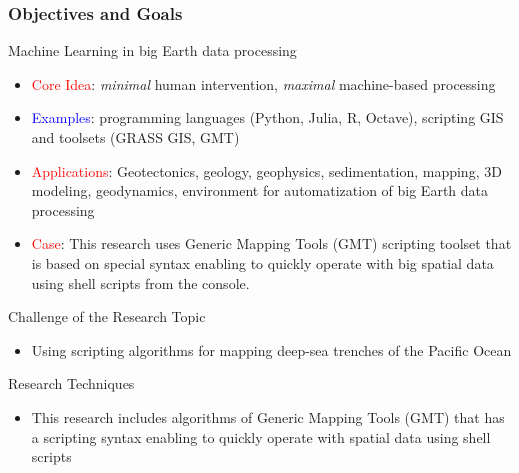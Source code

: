 \documentclass[pdflatex,compress,8pt,
	xcolor={dvipsnames,svgnames,x11names,table},
	hyperref={colorlinks = true,breaklinks = true, urlcolor = NavyBlue}]{beamer}
\begin{document}
\begin{frame}\frametitle{Objectives and Goals}
 
\begin{alertblock}{Machine Learning in big Earth data processing}
\begin{itemize}
	\item \textcolor{red}{Core Idea}: \emph{minimal} human intervention, \emph{maximal} machine-based processing
	\item \textcolor{blue}{Examples}: programming languages (Python, Julia, R, Octave), scripting GIS and toolsets (GRASS GIS, GMT)
	\item \textcolor{red}{Applications}: Geotectonics, geology, geophysics, sedimentation, mapping, 3D modeling, geodynamics, environment for automatization of big Earth data processing
	\item \textcolor{red}{Case}: This research uses Generic Mapping Tools (GMT) scripting toolset that is based on special syntax enabling to quickly operate with big spatial data using shell scripts from the console.
\end{itemize}
\end{alertblock}

\begin{exampleblock}{Challenge of the Research Topic}
\begin{itemize}
        	\item Using scripting algorithms for mapping deep-sea trenches of the Pacific Ocean
\end{itemize}
\end{exampleblock}
	
\begin{alertblock}{Research Techniques}
\begin{itemize}
	\item This research includes algorithms of Generic Mapping Tools (GMT) that has a scripting syntax enabling to quickly operate with spatial data using shell scripts
\end{itemize}
\end{alertblock}
\end{frame}

\end{document}

